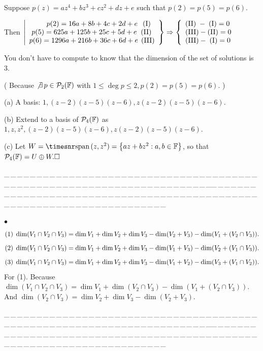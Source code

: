 \documentclass[a4paper, 11pt, UTF8]{article}
\def\Spn{{\timesnr\textup{span}}\,}
\def\Fbb{{\mathbb{F}}}
\def\BulletPoint{{\small$\bullet$}}
\def\Tips{{\timesbfx\large T{\footnotesize IPS:}}}
\def\ProblemEnding{{\tiny \_\,\_\,\_\,\_\,\_\,\_\,\_\,\_\,\_\,\_\,\_\,\_\,\_\,\_\,\_\,\_\,\_\,\_\,\_\,\_\,\_\,\_\,\_\,\_\,\_\,\_\,\_\,\_\,\_\,\_\,\_\,\_\,\_\,\_\,\_\,\_\,\_\,\_\,\_\,\_\,\_\,\_\,\_\,\_\,\_\,\_\,\_\,\_\,\_\,\_\,\_\,\_\,\_\,\_\,\_\,\_\,\_\,\_\,\_\,\_\,\_\,\_\,\_\,\_\,\_\,\_\,\_\,\_\,\_\,\_\,\_\_\,\_\,\_\,\_\,\_\,\_\,\_\,\_\,\_\,\_\,\_\,\_\,\_\,\_\,\_\,\_\,\_\,\_\,\_\,\_\,\_\,\_\,\_\,\_\,\_\,\_\,\_\,\_\,\_\,\_\,\_\,\_\,\_\,\_\,\_\,\_\,\_\,\_\,\_\,\_\,\_\,\_\,\_\,\_\,\_\,\_\,\_\,\_\,\_\,\_\,\_\,\_\,\_\,\_\,\_\,\_\,\_\,\_\,\_\,\_\,\_\,\_\,\_\,\_\,\_\,\_\,\_\,\_\,\_\,\_\,\_}}
\begin{document}
\begin{large}
Suppose $p(z)=az^4+bz^3+cz^2+dz+e$ such that $p(2)=p(5)=p(6)$.\vspace{4pt}\par\quad
Then $\left|\begin{array}{r}
	p(2)=16a+8b+4c+2d+e\,\;\;(\textup{I})\;\;\\
	p(5)=625a+125b+25c+5d+e\;\;(\textup{II})\,\;\\
	p(6)=1296a+216b+36c+6d+e\;\,(\textup{III})
\end{array}\right\}\Rightarrow\MathLeftBrace{l}{
	(\textup{II})\;-\;(\textup{I})=0\\
	(\textup{III})-(\textup{II})=0\\
	(\textup{III})-\;(\textup{I})=0\\
}$\vspace{4pt}\par\quad
{\timessl You don't have to compute to know that the dimension of the set of solutions is 3.}\par\quad
( Because $\not\exists\,p\in\PoF{2}$ with $1\leq\deg p\leq 2,p(2)=p(5)=p(6).$ )\par\quad
(a) A basis: $1,(z-2)(z-5)(z-6),z(z-2)(z-5)(z-6).$\par\quad
(b) Extend to a basis of $\PoF{4}$ as $1,z,z^2,(z-2)(z-5)(z-6),z(z-2)(z-5)(z-6).$\par\quad
(c) Let $W=\Spn(z,z^2)=\left\{az+bz^2:a,b\in\Fbb\right\}$, so that $\PoF{4}=U\oplus W.\hfill\square$\par
\ProblemEnding\par

\BulletPoint \,\hspace{1pt}\Tips\vspace{-30pt}\TextB{}
$$(1)\;\dim(V_1\cap V_2\cap V_3)=\dim V_1+\dim V_2+\dim V_3-\dim(V_2+V_3)-\dim(V_1+(V_2\cap V_3)).\vspace{-46pt}$$\TextB{}
$$(2)\;\dim(V_1\cap V_2\cap V_3)=\dim V_1+\dim V_2+\dim V_3-\dim(V_1+V_3)-\dim(V_2+(V_1\cap V_3)).\vspace{-46pt}$$\TextB{}
$$(3)\;\dim(V_1\cap V_2\cap V_3)=\dim V_1+\dim V_2+\dim V_3-\dim(V_1+V_2)-\dim(V_3+(V_1\cap V_2)).\vspace{-6pt}$$\TextB{}
For (1). Because $\dim (V_1\cap V_2\cap V_3)=\dim V_1+\dim(V_2\cap V_3)-\dim(V_1+(V_2\cap V_3)).$\TextB{}
And $\dim(V_2\cap V_3)=\dim V_2+\dim V_3-\dim(V_2+V_3).$\par
\ProblemEnding\par


\end{large}
\end{document}
